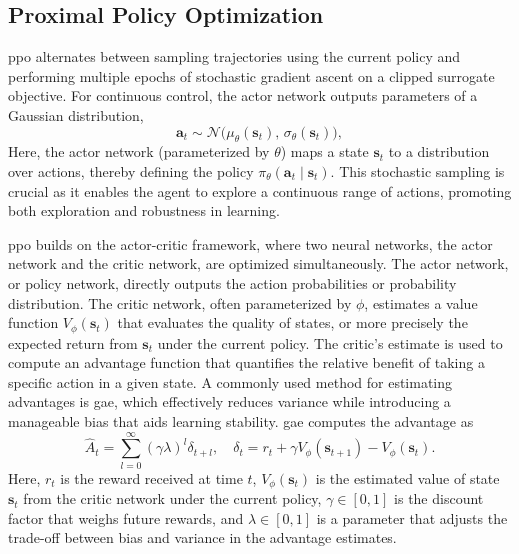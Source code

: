 \subsection{Proximal Policy Optimization}
\gls{ppo} \cite{schulman2017proximal} alternates between sampling trajectories using the current policy and performing multiple epochs of stochastic gradient ascent on a clipped surrogate objective. For continuous control, the actor network outputs parameters of a Gaussian distribution,
\begin{equation}
\mathbf{a}_t \sim \mathcal{N}\bigl(\mu_\theta(\mathbf{s}_t),\,\sigma_\theta(\mathbf{s}_t)\bigr),
\end{equation}
Here, the actor network (parameterized by \(\theta\)) maps a state \(\mathbf{s}_t\) to a distribution over actions, thereby defining the policy \(\pi_\theta(\mathbf{a}_t \mid \mathbf{s}_t)\). This stochastic sampling is crucial as it enables the agent to explore a continuous range of actions, promoting both exploration and robustness in learning.

\gls{ppo} builds on the actor-critic framework, where two neural networks, the actor network and the critic network, are optimized simultaneously. The actor network, or policy network, directly outputs the action probabilities or probability distribution. The critic network, often parameterized by \(\phi\), estimates a value function \(V_\phi(\mathbf{s}_t)\) that evaluates the quality of states, or more precisely the expected return from \(\mathbf{s}_t\) under the current policy. The critic's estimate is used to compute an advantage function that quantifies the relative benefit of taking a specific action in a given state. A commonly used method for estimating advantages is \gls{gae}, which effectively reduces variance while introducing a manageable bias that aids learning stability. \gls{gae} computes the advantage as
\begin{equation}
\hat{A}_t = \sum_{l=0}^{\infty} (\gamma \lambda)^l \delta_{t+l}, 
\quad
\delta_t = r_t + \gamma V_\phi(\mathbf{s}_{t+1}) - V_\phi(\mathbf{s}_t).
\end{equation}
Here, \(r_t\) is the reward received at time \(t\), \(V_\phi(\mathbf{s}_t)\) is the estimated value of state \(\mathbf{s}_t\) from the critic network under the current policy, \(\gamma \in [0,1]\) is the discount factor that weighs future rewards, and \(\lambda \in [0,1]\) is a parameter that adjusts the trade-off between bias and variance in the advantage estimates.

